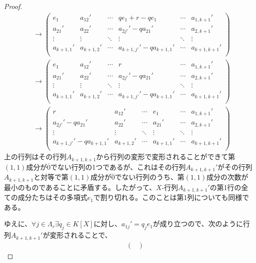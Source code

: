 \documentclass[dvipdfmx]{jsarticle}
\begin{document}
\begin{proof}
\begin{align*}
&\rightarrow \begin{pmatrix}
e_{1} & a_{12}' & \cdots & qe_{1} + r - qe_{1} & \cdots & a_{1,k + 1}' \\
a_{21}' & a_{22}' & \cdots & a_{2j'}' - qa_{21}' & \cdots & a_{2,k + 1}' \\
 \vdots & \vdots & \ddots & \vdots & \ddots & \vdots \\
a_{k + 1,1}' & a_{k + 1,2}' & \cdots & a_{k + 1,j'}' - qa_{k + 1,1}' & \cdots & a_{k + 1,k + 1}' \\
\end{pmatrix}\\
&\rightarrow \begin{pmatrix}
e_{1} & a_{12}' & \cdots & r & \cdots & a_{1,k + 1}' \\
a_{21}' & a_{22}' & \cdots & a_{2j'}' - qa_{21}' & \cdots & a_{2,k + 1}' \\
 \vdots & \vdots & \ddots & \vdots & \ddots & \vdots \\
a_{k + 1,1}' & a_{k + 1,2}' & \cdots & a_{k + 1,j'}' - qa_{k + 1,1}' & \cdots & a_{k + 1,k + 1}' \\
\end{pmatrix}\\
&\rightarrow \begin{pmatrix}
r & a_{12}' & \cdots & e_{1} & \cdots & a_{1,k + 1}' \\
a_{2j'}' - qa_{21}' & a_{22}' & \cdots & a_{21}' & \cdots & a_{2,k + 1}' \\
 \vdots & \vdots & \ddots & \vdots & \ddots & \vdots \\
a_{k + 1,j'}' - qa_{k + 1,1}' & a_{k + 1,2}' & \cdots & a_{k + 1,1}' & \cdots & a_{k + 1,k + 1}' \\
\end{pmatrix}
\end{align*}
上の行列はその行列$A_{k + 1,k + 1}$から行列の変形で変形されることができて第$(1,1)$成分が$\overline{0}$でない行列の1つであるが、これはその行列$A_{k + 1,k + 1}'$がその行列$A_{k + 1,k + 1}$と対等で第$(1,1)$成分が$\overline{0}$でない行列のうち、第$(1,1)$成分の次数が最小のものであることに矛盾する。したがって、$X$-行列$A_{k + 1,k + 1}'$の第1行の全ての成分たちはその多項式$e_{1}$で割り切れる。このことは第1列についても同様である。\par
ゆえに、$\forall j \in \varLambda_{r}\exists q_{j} \in K[ X]$に対し、$a_{1j}' = q_{j}e_{1}$が成り立つので、次のように行列$A_{k + 1,k + 1}'$が変形されることで、
\begin{align*}
&\quad \begin{pmatrix}

\end{pmatrix}
\end{align*}
\end{proof}
\end{document}
